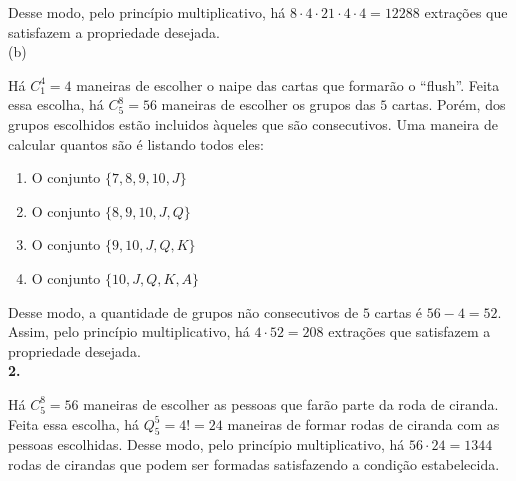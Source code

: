 \documentclass[12pt, a4paper]{article}
\begin{document}
Desse modo, pelo princípio multiplicativo, há \(8\cdot{4}\cdot{21}\cdot{4}\cdot{4} = 12288\) extrações que satisfazem a propriedade desejada. \\

(b)

Há \(C^4_1 = 4\) maneiras de escolher o naipe das cartas que formarão o ``flush''. Feita essa escolha, há \(C^8_5 = 56\) maneiras de escolher os grupos das \(5\) cartas. Porém, dos grupos escolhidos estão incluidos àqueles que são consecutivos. Uma maneira de calcular quantos são é listando todos eles: 

\begin{enumerate}
\item O conjunto \(\{7, 8, 9, 10, J\}\)

\item O conjunto \(\{8, 9, 10, J, Q\}\)

\item O conjunto \(\{9, 10, J, Q, K\}\)

\item O conjunto \(\{10, J, Q, K, A\}\)
\end{enumerate} 

Desse modo, a quantidade de grupos não consecutivos de \(5\) cartas é \(56 - 4 = 52\). Assim, pelo princípio multiplicativo, há \(4\cdot{52}= 208\) extrações que satisfazem a propriedade desejada. \\

\textbf{2.}

Há \(C^8_5 = 56\) maneiras de escolher as pessoas que farão parte da roda de ciranda. Feita essa escolha, há \(Q^5_5 = 4! = 24\) maneiras de formar rodas de ciranda com as pessoas escolhidas. 
Desse modo, pelo princípio multiplicativo, há \(56\cdot{24}= 1344\) rodas de cirandas que podem ser formadas satisfazendo a condição estabelecida. \\
\end{document}
